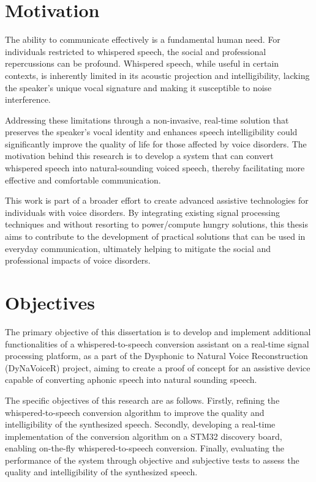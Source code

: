 \section{Motivation}

The ability to communicate effectively is a fundamental human need. For individuals restricted to whispered speech, the social and professional repercussions can be profound. Whispered speech, while useful in certain contexts, is inherently limited in its acoustic projection and intelligibility, lacking the speaker's unique vocal signature and making it susceptible to noise interference.

Addressing these limitations through a non-invasive, real-time solution that preserves the speaker's vocal identity and enhances speech intelligibility could significantly improve the quality of life for those affected by voice disorders. The motivation behind this research is to develop a system that can convert whispered speech into natural-sounding voiced speech, thereby facilitating more effective and comfortable communication.

This work is part of a broader effort to create advanced assistive technologies for individuals with voice disorders. By integrating existing signal processing techniques and without resorting to power/compute hungry solutions, this thesis aims to contribute to the development of practical solutions that can be used in everyday communication, ultimately helping to mitigate the social and professional impacts of voice disorders.

\section{Objectives}

The primary objective of this dissertation is to develop and implement additional functionalities of a whispered-to-speech conversion assistant on a real-time signal processing platform, as a part of the Dysphonic to Natural Voice Reconstruction (DyNaVoiceR) project, aiming to create a proof of concept for an assistive device capable of converting aphonic speech into natural sounding speech.

The specific objectives of this research are as follows. Firstly, refining the whispered-to-speech conversion algorithm to improve the quality and intelligibility of the synthesized speech. Secondly, developing a real-time implementation of the conversion algorithm on a STM32 discovery board, enabling on-the-fly whispered-to-speech conversion. Finally, evaluating the performance of the system through objective and subjective tests to assess the quality and intelligibility of the synthesized speech.

